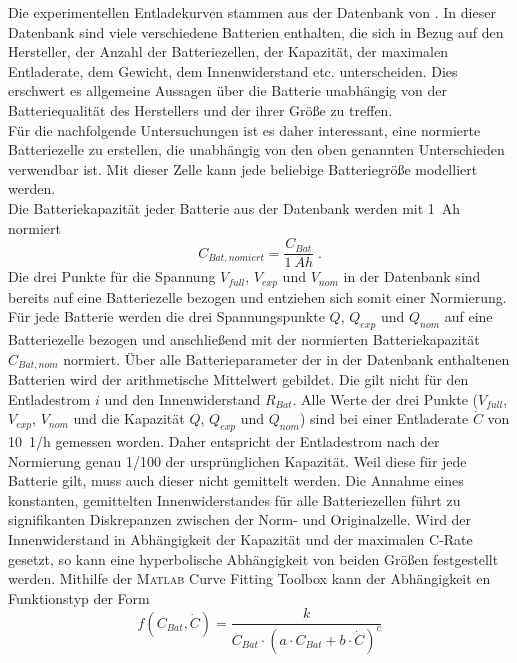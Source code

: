 Die experimentellen Entladekurven stammen aus der Datenbank von \cite{elektromodellflug}. In dieser Datenbank sind viele verschiedene Batterien enthalten, die sich in Bezug auf den Hersteller, der Anzahl der Batteriezellen, der Kapazität, der maximalen Entladerate, dem Gewicht, dem Innenwiderstand etc. unterscheiden. Dies erschwert es allgemeine Aussagen über die Batterie unabhängig von der Batteriequalität des Herstellers und der ihrer Größe zu treffen. \\
Für die nachfolgende Untersuchungen ist es daher interessant, eine normierte Batteriezelle zu erstellen, die unabhängig von den oben genannten Unterschieden verwendbar ist. Mit dieser Zelle kann jede beliebige Batteriegröße modelliert werden. \\
Die Batteriekapazität jeder Batterie aus der Datenbank werden mit \SI{1}{Ah} normiert
\begin{equation}
	C_{Bat,nomiert} = \frac{C_{Bat}}{\SI{1}{Ah}}\; .
\end{equation} 
Die drei Punkte für die Spannung \ensuremath{V_{full}}, \ensuremath{V_{exp}} und \ensuremath{V_{nom}} in der Datenbank sind bereits auf eine Batteriezelle bezogen und entziehen sich somit einer Normierung. 
Für jede Batterie werden die drei Spannungspunkte \ensuremath{Q}, \ensuremath{Q_{exp}} und \ensuremath{Q_{nom}} auf eine Batteriezelle bezogen und anschließend mit der normierten Batteriekapazität \ensuremath{C_{Bat,nom}} normiert. 
Über alle Batterieparameter der in der Datenbank enthaltenen Batterien wird der arithmetische Mittelwert gebildet. 
Die gilt nicht für den Entladestrom \ensuremath{i} und den Innenwiderstand \ensuremath{R_{Bat}}. Alle Werte der drei Punkte (\ensuremath{V_{full}}, \ensuremath{V_{exp}}, \ensuremath{V_{nom}} und die Kapazität \ensuremath{Q}, \ensuremath{Q_{exp}} und \ensuremath{Q_{nom}}) sind bei einer Entladerate \ensuremath{\dot{C}} von \SI{10}{1/h} gemessen worden. Daher entspricht der Entladestrom nach der Normierung genau 1/100 der ursprünglichen Kapazität.
Weil diese für jede Batterie gilt, muss auch dieser nicht gemittelt werden. 
Die Annahme eines konstanten, gemittelten Innenwiderstandes für alle Batteriezellen führt zu signifikanten Diskrepanzen zwischen der Norm- und Originalzelle. 
Wird der Innenwiderstand in Abhängigkeit der Kapazität und der maximalen C-Rate gesetzt, so kann eine hyperbolische Abhängigkeit von beiden Größen festgestellt werden. 
Mithilfe der \textsc{Matlab} Curve Fitting Toolbox kann der Abhängigkeit en Funktionstyp der Form
\begin{equation}
	f(C_{Bat},\dot{C}) = \frac{k}{C_{Bat}\cdot(a\cdot C_{Bat}+b\cdot \dot{C})^c}
\end{equation}
